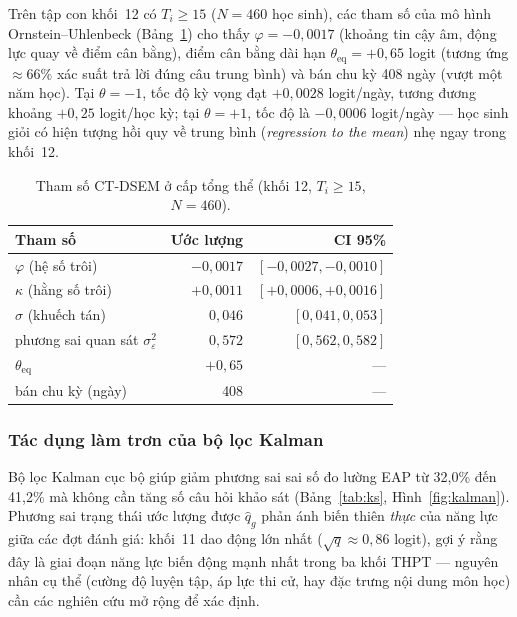 Trên tập con khối~12 có \(T_i \ge 15\) (\(N = 460\) học sinh), các tham số của mô hình Ornstein--Uhlenbeck (Bảng~\ref{tab:ctdsem}) cho thấy \(\varphi = -0{,}0017\) (khoảng tin cậy âm, động lực quay về điểm cân bằng), điểm cân bằng dài hạn \(\theta_{\mathrm{eq}} = +0{,}65\) logit (tương ứng \(\approx 66\%\) xác suất trả lời đúng câu trung bình) và bán chu kỳ 408 ngày (vượt một năm học). Tại \(\theta = -1\), tốc độ kỳ vọng đạt \(+0{,}0028\) logit/ngày, tương đương khoảng \(+0{,}25\) logit/học kỳ; tại \(\theta = +1\), tốc độ là \(-0{,}0006\) logit/ngày --- học sinh giỏi có hiện tượng hồi quy về trung bình (\emph{regression to the mean}) nhẹ ngay trong khối~12.

\begin{table}[H]
\centering\small
\caption{Tham số CT-DSEM ở cấp tổng thể (khối 12, $T_i \ge 15$, $N = 460$).}
\label{tab:ctdsem}
\begin{tabular}{lrr}
\toprule
\textbf{Tham số} & \textbf{Ước lượng} & \textbf{CI 95\%} \\
\midrule
$\varphi$ (hệ số trôi)              & $-0{,}0017$ & $[-0{,}0027, -0{,}0010]$ \\
$\kappa$ (hằng số trôi)            & $+0{,}0011$ & $[+0{,}0006, +0{,}0016]$ \\
$\sigma$ (khuếch tán)               & $0{,}046$   & $[0{,}041, 0{,}053]$ \\
phương sai quan sát $\sigma_\varepsilon^2$ & $0{,}572$ & $[0{,}562, 0{,}582]$ \\
$\theta_{\mathrm{eq}}$              & $+0{,}65$   & --- \\
bán chu kỳ (ngày)                   & 408         & --- \\
\bottomrule
\end{tabular}
\end{table}

\subsubsection{Tác dụng làm trơn của bộ lọc Kalman}

Bộ lọc Kalman cục bộ giúp giảm phương sai sai số đo lường EAP từ 32{,}0\% đến 41{,}2\% mà không cần tăng số câu hỏi khảo sát (Bảng~\ref{tab:ks}, Hình~\ref{fig:kalman}). Phương sai trạng thái ước lượng được \(\hat q_g\) phản ánh biến thiên \emph{thực} của năng lực giữa các đợt đánh giá: khối~11 dao động lớn nhất (\(\sqrt{q} \approx 0{,}86\) logit), gợi ý rằng đây là giai đoạn năng lực biến động mạnh nhất trong ba khối THPT --- nguyên nhân cụ thể (cường độ luyện tập, áp lực thi cử, hay đặc trưng nội dung môn học) cần các nghiên cứu mở rộng để xác định.

